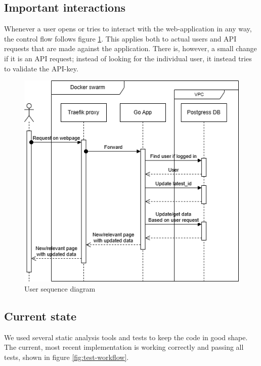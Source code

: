 \subsection{Important interactions} %



Whenever a user opens or tries to interact with the web-application in any way, the control flow follows figure \ref{fig:user-seq}. This applies both to actual users and API requests that are made against the application. There is, however, a small change if it is an API request; instead of looking for the individual user, it instead tries to validate the API-key.

\begin{figure}[h!]
  \centering
  \includegraphics[width=\textwidth]{images/User seq dia.png}
  \caption{User sequence diagram}
  \label{fig:user-seq}
\end{figure}


\subsection{Current state} %
We used several static analysis tools and tests to keep the
code in good shape. The current, most recent implementation
is working correctly and passing all tests, shown in figure \ref{fig:test-workflow}.

